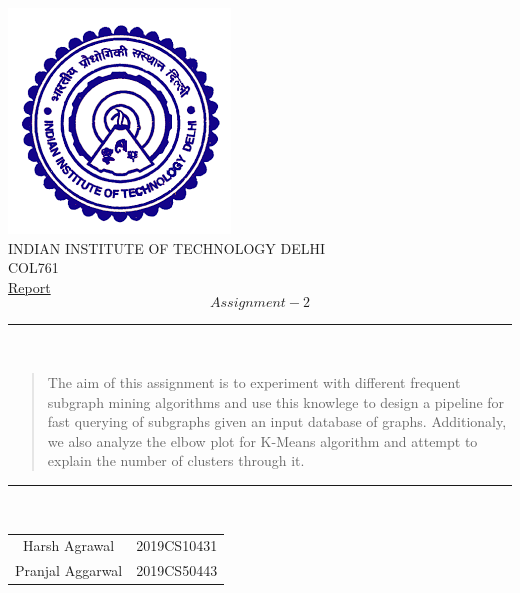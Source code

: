 \documentclass[hidelinks,12pt]{article}
\begin{document}
\begin{titlepage}
  \centering
  \includegraphics[scale=0.5]{./iitdlogo.png}\\[1.0cm]
  \Large INDIAN INSTITUTE OF TECHNOLOGY DELHI\\[1.0 cm]
  \LARGE COL761\\[0.1cm]
  \Large \underline{Report}\\
  \large \[Assignment-2\]


  \rule{\textwidth}{0.2 mm} \\[0.1cm]
  \begin{abstract}
    The aim of this assignment is to experiment with different frequent subgraph mining algorithms and use this knowlege to design a pipeline for fast querying of subgraphs given an input database of graphs. Additionaly, we also analyze the elbow plot for K-Means algorithm and attempt to explain the number of clusters through it.
  \end{abstract}
  \rule{\textwidth}{0.2 mm} \\[0.1cm]
  \begin{flushright}

    \begin{tabular}{c|c}
      \small {Harsh Agrawal}    & \small {2019CS10431} \\
      \small {Pranjal Aggarwal} & \small {2019CS50443} \\
    \end{tabular}
  \end{flushright}
\end{titlepage}
\newpage
\end{document}
